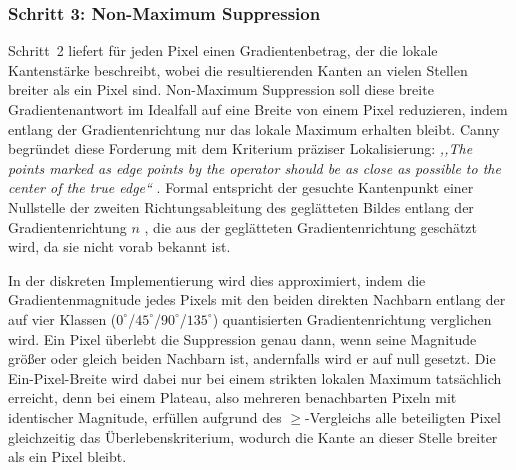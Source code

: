 \subsubsection{Schritt 3: Non-Maximum Suppression}

Schritt~2 liefert für jeden Pixel einen Gradientenbetrag, der die lokale
Kantenstärke beschreibt, wobei die resultierenden Kanten an vielen
Stellen breiter als ein Pixel sind. Non-Maximum Suppression soll diese
breite Gradientenantwort im Idealfall auf eine Breite von einem Pixel
reduzieren, indem entlang der Gradientenrichtung nur das lokale Maximum
erhalten bleibt. Canny begründet diese Forderung mit dem Kriterium
präziser Lokalisierung: \textit{,,The points marked as edge points by
the operator should be as close as possible to the center of the true
edge``} \cite[S.~680]{canny1986}. Formal entspricht der gesuchte
Kantenpunkt einer Nullstelle der zweiten Richtungsableitung des
geglätteten Bildes entlang der Gradientenrichtung $n$
\cite[S.~691]{canny1986}, die aus der geglätteten Gradientenrichtung
geschätzt wird, da sie nicht vorab bekannt ist.

In der diskreten Implementierung wird dies approximiert, indem die
Gradientenmagnitude jedes Pixels mit den beiden direkten Nachbarn
entlang der auf vier Klassen ($0^\circ$/$45^\circ$/$90^\circ$/$135^\circ$)
quantisierten Gradientenrichtung verglichen wird. Ein Pixel überlebt
die Suppression genau dann, wenn seine Magnitude größer oder gleich
beiden Nachbarn ist, andernfalls wird er auf null gesetzt. Die
Ein-Pixel-Breite wird dabei nur bei einem strikten lokalen Maximum
tatsächlich erreicht, denn bei einem Plateau, also mehreren
benachbarten Pixeln mit identischer Magnitude, erfüllen aufgrund des
$\geq$-Vergleichs alle beteiligten Pixel gleichzeitig das
Überlebenskriterium, wodurch die Kante an dieser Stelle breiter als ein
Pixel bleibt.